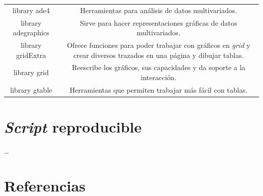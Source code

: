 \documentclass[11pt,]{article}
\begin{document}
\begin{longtable}[]{@{}cc@{}}
\begin{minipage}[t]{0.14\columnwidth}
library ade4\strut
\end{minipage} & \begin{minipage}[t]{0.80\columnwidth}\centering\strut
Herramientas para análisis de datos multivariados.\strut
\end{minipage}\tabularnewline
\begin{minipage}[t]{0.14\columnwidth}\centering\strut
library adegraphics\strut
\end{minipage} & \begin{minipage}[t]{0.80\columnwidth}\centering\strut
Sirve para hacer representaciones gráficas de datos multivariados.\strut
\end{minipage}\tabularnewline
\begin{minipage}[t]{0.14\columnwidth}\centering\strut
library gridExtra\strut
\end{minipage} & \begin{minipage}[t]{0.80\columnwidth}\centering\strut
Ofrece funciones para poder trabajar con gráficos en \emph{grid} y crear
diversos trazados en una página y dibujar tablas.\strut
\end{minipage}\tabularnewline
\begin{minipage}[t]{0.14\columnwidth}\centering\strut
library grid\strut
\end{minipage} & \begin{minipage}[t]{0.80\columnwidth}\centering\strut
Reescribe los gráficos, sus capacidades y da soporte a la
interacción.\strut
\end{minipage}\tabularnewline
\begin{minipage}[t]{0.14\columnwidth}\centering\strut
library gtable\strut
\end{minipage} & \begin{minipage}[t]{0.80\columnwidth}\centering\strut
Herramientas que permiten trabajar más fácil con tablas.\strut
\end{minipage}\tabularnewline
\bottomrule
\end{longtable}

\section{\texorpdfstring{\emph{Script}
reproducible}{Script reproducible}}\label{script-reproducible}

\ldots

\section*{Referencias}\label{referencias}
\end{document}
